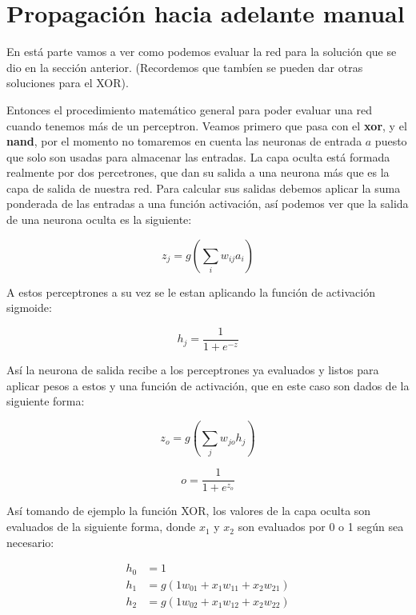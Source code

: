 \section{Propagación hacia adelante manual}

En está parte vamos a ver como podemos evaluar la red para la solución que se dio en la sección anterior. (Recordemos que tambíen se pueden dar otras soluciones para el XOR).

Entonces el procedimiento matemático general para poder evaluar una red cuando tenemos más de un perceptron. Veamos primero que pasa con el \textbf{xor}, y el \textbf{nand}, por el momento no tomaremos en cuenta las neuronas de entrada $a$ puesto que solo son usadas para almacenar las entradas. La capa oculta está formada realmente por dos percetrones, que dan su salida a una neurona más que es la capa de salida de nuestra red. Para calcular sus salidas debemos aplicar la suma ponderada de las entradas a una función activación, así podemos ver que la salida de una neurona oculta es la siguiente:
 
\begin{equation}
 z_{j} = g (\sum_{i} w_{ij}a_i)
\end{equation}

A estos perceptrones a su vez se le estan aplicando la función de activación sigmoide:

\begin{equation}
 h_{j} = \dfrac{1}{ 1 + e^{-z}}
\end{equation}

Así la neurona de salida recibe a los perceptrones ya evaluados y listos para aplicar pesos a estos y una función de activación, que en este caso son dados de la siguiente forma:

\begin{equation}
 z_{o} = g (\sum_{j} w_{jo}h_j)
\end{equation}

\begin{equation}
 o = \dfrac{1}{1 + e ^{z_o}}
\end{equation}

Así tomando de ejemplo la función XOR, los valores de la capa oculta son evaluados de la siguiente forma, donde $x_{1}$ y $x_{2}$ son evaluados por 0 o 1 según sea necesario:

\begin{equation}
 \begin{split}
 h_{0} &= 1 \\ 
 h_{1} &= g(1w_{01} + x_{1}w_{11} + x_{2}w_{21}) \\
 h_{2} &= g(1w_{02} + x_{1}w_{12} + x_{2}w_{22}) 
 \end{split}
\end{equation}


